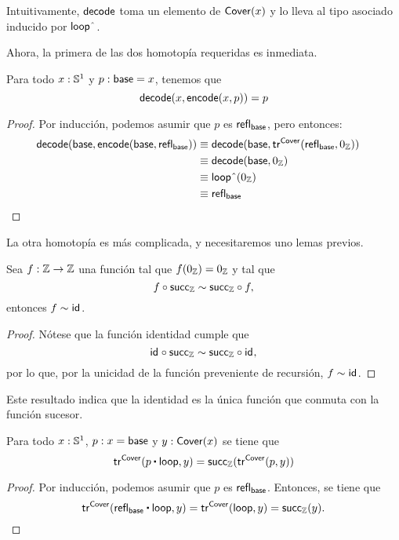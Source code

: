 \documentclass[../main.tex]{subfiles}
\begin{document}
Intuitivamente, $\mathsf{decode}$ toma un elemento de $\mathsf{Cover}(x)$ y lo lleva al tipo asociado inducido por $\lloop\string^$.

Ahora, la primera de las dos homotop\'ia requeridas es inmediata.

\begin{lemma}
  Para todo $x:\mathbb{S}^1$ y $p:\mathsf{base}=x$, tenemos que
  \[ \mathsf{decode}(x, \mathsf{encode}(x,p)) = p \]
\end{lemma}
\begin{proof}
  Por inducci\'on, podemos asumir que $p$ es $\mathsf{refl}_{\mathsf{base}}$, pero entonces:
  \begin{align*}
    \decode(\base, \encode(\base,\refl{\base}))
     & \jdeq \decode(\base, \trfib{\cover}{\refl{\base}}{0_\Z}) &  & \text{} \\
     & \jdeq \decode(\base, 0_\Z)                               &  & \text{} \\
     & \jdeq \lloop\string^(0_\Z)                               &  & \text{} \\
     & \jdeq \refl{\base}                                       &  & \text{}
  \end{align*}
\end{proof}

La otra homotop\'ia es m\'as complicada, y necesitaremos uno lemas previos.

\begin{lemma}\label{endo-Z-is-id}
  Sea $f:\mathbb{Z} \to \mathbb{Z}$ una funci\'on tal que $f(0_\mathbb{Z})=0_\mathbb{Z}$  y tal que
  \[ f \circ \mathsf{succ}_\mathbb{Z} \sim \mathsf{succ}_\mathbb{Z} \circ f, \]
  entonces $f \sim \mathsf{id}_{}$.
\end{lemma}
\begin{proof}
  N\'otese que la funci\'on identidad cumple que
  \[ \mathsf{id}_{} \circ \mathsf{succ}_\mathbb{Z} \sim \mathsf{succ}_\mathbb{Z} \circ \mathsf{id}_{}, \]
  por lo que, por la unicidad de la funci\'on preveniente de recursi\'on, $f \sim \mathsf{id}_{}$.
\end{proof}

Este resultado indica que la identidad es la \'unica funci\'on que conmuta con la funci\'on sucesor.

\begin{lemma}\label{tr-Cover-then-loop}
  Para todo $x: \mathbb{S}^1$, $p : x = \mathsf{base}$ y $y:\mathsf{Cover}(x)$ se tiene que
  \[ \trfib{\cover}{p \ct \lloop}{y} = \suc_\Z(\trfib{\cover}{p}{y})  \]
\end{lemma}
\begin{proof}
  Por inducci\'on, podemos asumir que $p$ es $\mathsf{refl}_{\mathsf{base}}$. Entonces, se tiene que
  \[ \trfib{\cover}{\refl{\base} \ct \lloop}{y}
    = \trfib{\cover}{\lloop}{y}
    = \suc_\Z(y). \]
\end{proof}
\end{document}
